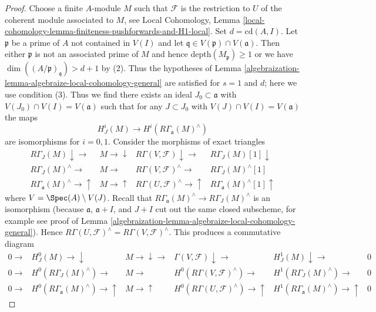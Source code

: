 \begin{proof}

Choose a finite $A$-module $M$ such that $\mathcal{F}$ is the restriction
to $U$ of the coherent module associated to $M$, see Local Cohomology,
Lemma \ref{local-cohomology-lemma-finiteness-pushforwards-and-H1-local}.
Set $d = \text{cd}(A, I)$.
Let $\mathfrak p$ be a prime of $A$ not contained in $V(I)$
and let $\mathfrak q \in V(\mathfrak p) \cap V(\mathfrak a)$.
Then either $\mathfrak p$ is not an associated prime of $M$
and hence $\text{depth}(M_\mathfrak p) \geq 1$
or we have $\dim((A/\mathfrak p)_\mathfrak q) > d + 1$ by (2).
Thus the hypotheses of
Lemma \ref{algebraization-lemma-algebraize-local-cohomology-general}
are satisfied for $s = 1$ and $d$; here we use condition (3).
Thus we find there exists an ideal
$J_0 \subset \mathfrak a$ with $V(J_0) \cap V(I) = V(\mathfrak a)$
such that for any $J \subset J_0$ with $V(J) \cap V(I) = V(\mathfrak a)$
the maps
$$
H^i_J(M) \longrightarrow H^i(R\Gamma_\mathfrak a(M)^\wedge)
$$
are isomorphisms for $i = 0, 1$. Consider the morphisms of
exact triangles
$$
\begin{array}{cccc}R\Gamma_J(M)  \downarrow\longrightarrow & M \longrightarrow\downarrow & R\Gamma(V, \mathcal{F}) \downarrow\longrightarrow & R\Gamma_J(M)[1]  \downarrow \\ R\Gamma_J(M)^\wedge \longrightarrow & M \longrightarrow & R\Gamma(V, \mathcal{F})^\wedge \longrightarrow & R\Gamma_J(M)^\wedge[1] \\ R\Gamma_\mathfrak a(M)^\wedge \longrightarrow\uparrow & M \longrightarrow\uparrow & R\Gamma(U, \mathcal{F})^\wedge \longrightarrow\uparrow & R\Gamma_\mathfrak a(M)^\wedge[1] \uparrow\end{array}
$$
where $V = \Spec(A) \setminus V(J)$. Recall that
$R\Gamma_\mathfrak a(M)^\wedge \to R\Gamma_J(M)^\wedge$
is an isomorphism (because $\mathfrak a$, $\mathfrak a + I$, and $J + I$
cut out the same closed subscheme, for example
see proof of Lemma \ref{algebraization-lemma-algebraize-local-cohomology-general}).
Hence
$R\Gamma(U, \mathcal{F})^\wedge = R\Gamma(V, \mathcal{F})^\wedge$.
This produces a commutative diagram
$$
\begin{array}{cccccc}0 \longrightarrow & H^0_J(M) \longrightarrow\downarrow & M \longrightarrow\downarrow\longrightarrow & \Gamma(V, \mathcal{F}) \downarrow\longrightarrow & H^1_J(M) \downarrow\longrightarrow & 0 \\ 0 \longrightarrow & H^0(R\Gamma_J(M)^\wedge) \longrightarrow & M \longrightarrow & H^0(R\Gamma(V, \mathcal{F})^\wedge) \longrightarrow & H^1(R\Gamma_J(M)^\wedge) \longrightarrow & 0 \\ 0 \longrightarrow & H^0(R\Gamma_\mathfrak a(M)^\wedge) \longrightarrow\uparrow & M \longrightarrow\uparrow & H^0(R\Gamma(U, \mathcal{F})^\wedge) \longrightarrow\uparrow & H^1(R\Gamma_\mathfrak a(M)^\wedge) \longrightarrow\uparrow & 0\end{array}
$$
\end{proof}
